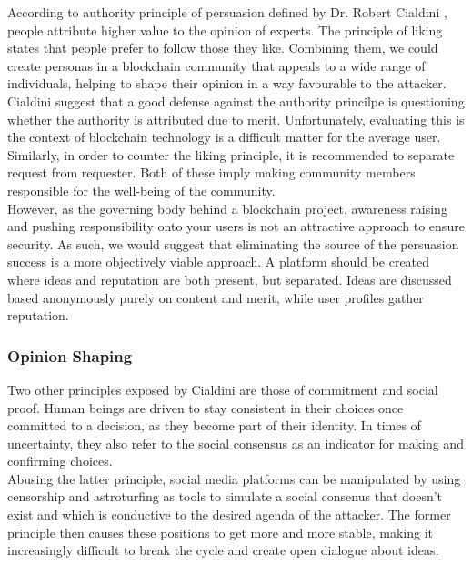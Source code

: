 \documentclass[12pt,a4paper]{article}
\begin{document}
According to authority principle of persuasion defined by Dr. Robert Cialdini \cite{persuasion}, people attribute higher value to the opinion of experts. The principle of liking states that people prefer to follow those they like. Combining them, we could create personas in a blockchain community that appeals to a wide range of individuals, helping to shape their opinion in a way favourable to the attacker.\\

Cialdini suggest that a good defense against the authority princilpe is questioning whether the authority is attributed due to merit. Unfortunately, evaluating this is the context of blockchain technology is a difficult matter for the average user. Similarly, in order to counter the liking principle, it is recommended to separate request from requester. Both of these imply making community members responsible for the well-being of the community.\\

However, as the governing body behind a blockchain project, awareness raising and pushing responsibility onto your users is not an attractive approach to ensure security. As such, we would suggest that eliminating the source of the persuasion success is a more objectively viable approach. A platform should be created where ideas and reputation are both present, but separated. Ideas are discussed based anonymously purely on content and merit, while user profiles gather reputation.\\

\subsubsection{Opinion Shaping}

Two other principles exposed by Cialdini are those of commitment and social proof. Human beings are driven to stay consistent in their choices once committed to a decision, as they become part of their identity. In times of uncertainty, they also refer to the social consensus as an indicator for making and confirming choices.\\

Abusing the latter principle, social media platforms can be manipulated by using censorship and astroturfing \cite{astroturf} as tools to simulate a social consenus that doesn't exist and which is conductive to the desired agenda of the attacker. The former principle then causes these positions to get more and more stable, making it increasingly difficult to break the cycle and create open dialogue about ideas.\\
\end{document}

